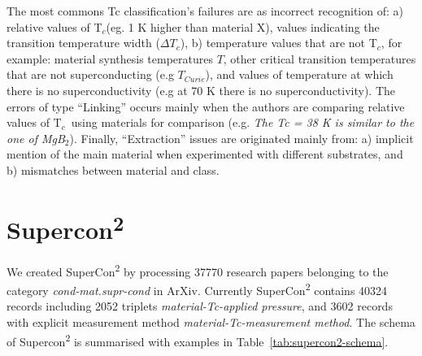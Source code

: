 \documentclass{article}
\newcommand{\tc}{T$_{c}$}
\begin{document}
The most commons Tc classification's failures are as incorrect recognition of: a) relative values of \tc (eg. 1 K higher than material X), values indicating the transition temperature width ($\Delta T_{c}$),  b) temperature values that are not \tc, for example: material synthesis temperatures $T$, other critical transition temperatures that are not superconducting (e.g $T_{Curie}$), and values of temperature at which there is no superconductivity (e.g at 70 K there is no superconductivity).
The errors of type ``Linking'' occurs mainly when the authors are comparing relative values of \tc~using materials for comparison (e.g. \textit{The Tc = 38 K is similar to the one of MgB$_{2}$}). 
Finally, ``Extraction'' issues are originated mainly from: a) implicit mention of the main material when experimented with different substrates, and b) mismatches between material and class. 



\section{Supercon\textsuperscript{2}}

We created SuperCon\textsuperscript{2} by processing 37770 research papers belonging to the category \textit{cond-mat.supr-cond} in ArXiv. 
Currently SuperCon\textsuperscript{2} contains 40324 records including 2052 triplets \textit{material-Tc-applied pressure}, and 3602 records with explicit measurement method \textit{material-Tc-measurement method}.
The schema of Supercon\textsuperscript{2} is summarised with examples in Table~\ref{tab:supercon2-schema}. 
\end{document}
